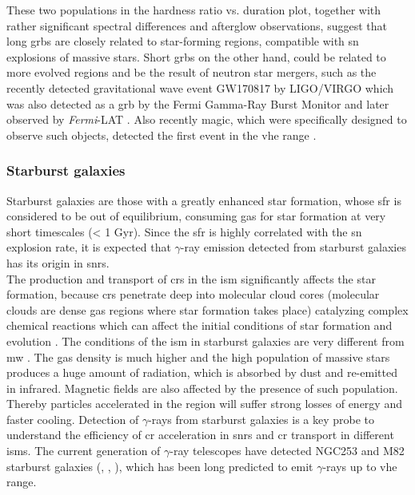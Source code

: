 \documentclass[main.tex]{subfiles}
\begin{document}
These two populations in the hardness ratio vs. duration plot, together with rather significant spectral differences \cite{2015GRBorigin} and afterglow observations, suggest that long \glspl{grb} are closely related to star-forming regions, compatible with \gls{sn} explosions of massive stars. Short \glspl{grb} on the other hand, could be related to more evolved regions and be the result of neutron star mergers, such as the recently detected gravitational wave event GW170817 by LIGO/VIRGO \cite{2017GW170817} which was also detected as a \gls{grb} by the Fermi Gamma-Ray Burst Monitor and later observed by \textit{Fermi}-LAT \cite{2018FermiGW170817}. Also recently \gls{magic}, which were specifically designed to observe such objects, detected the first event in the \gls{vhe} range \cite{2019MAGICGRB}.

\subsubsection{Starburst galaxies}

Starburst galaxies are those with a greatly enhanced star formation, whose \gls{sfr} is considered to be out of equilibrium, consuming gas for star formation at very short timescales (< 1 Gyr). Since the \gls{sfr} is highly correlated with the \gls{sn} explosion rate, it is expected that $\gamma$-ray emission detected from starburst galaxies has its origin in \glspl{snr}.\\
The production and transport of \glspl{cr} in the \gls{ism} significantly affects the star formation, because \glspl{cr} penetrate deep into molecular cloud cores (molecular clouds are dense gas regions where star formation takes place) catalyzing complex chemical reactions which can affect the initial conditions of star formation and evolution \cite{2016starburst}. The conditions of the \gls{ism} in starburst galaxies are very different from \gls{mw} \cite{2009starbursthess}. The gas density is much higher and the high population of massive stars produces a huge amount of radiation, which is absorbed by dust and re-emitted in infrared. Magnetic fields are also affected by the presence of such population. Thereby particles accelerated in the region will suffer strong losses of energy and faster cooling. Detection of $\gamma$-rays from starburst galaxies is a key probe to understand the efficiency of \gls{cr} acceleration in \glspl{snr} and \gls{cr} transport in different \glspl{ism}.  The current generation of $\gamma$-ray telescopes have detected NGC253 and M82 starburst galaxies (\cite{2009starbursthess}, \cite{2009starburstveritas}, \cite{2010starburstFermi}), which has been long predicted to emit $\gamma$-rays up to \gls{vhe} range.
\end{document}
